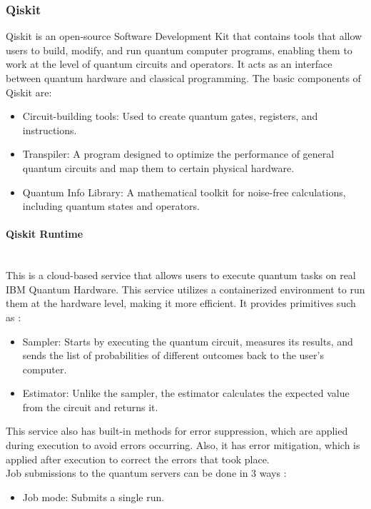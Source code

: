 \documentclass[a4paper]{report}
\begin{document}
{\begin{itemize}
\subsubsection{{Qiskit}}
Qiskit is an open-source Software Development Kit that contains tools that allow users to build, modify, and run quantum computer programs, enabling them to work at the level of quantum circuits and operators. It acts as an interface between quantum hardware and classical programming.
The basic components of Qiskit are:

\begin{itemize}
    \item Circuit-building tools: Used to create quantum gates, registers, and instructions.

\end{itemize}
\begin{itemize}
    \item Transpiler: A program designed to optimize the performance of general quantum circuits and map them to certain physical hardware.
\end{itemize}
\begin{itemize}
    \item Quantum Info Library: A mathematical toolkit for noise-free calculations, including quantum states and operators.
\end{itemize}
\paragraph{Qiskit Runtime}
\mbox{} \\
This is a cloud-based service that allows users to execute quantum tasks on real IBM Quantum Hardware. This service utilizes a containerized environment to run them at the hardware level, making it more efficient. It provides primitives such as :
\begin{itemize}
    \item Sampler:  Starts by executing the quantum circuit, measures its results, and sends the list of probabilities of different outcomes back to the user's computer.
\end{itemize}
\begin{itemize}
    \item Estimator: Unlike the sampler, the estimator calculates the expected value from the circuit and returns it.

\end{itemize}

This service also has built-in methods for error suppression, which are applied during execution to avoid errors occurring. Also, it has error mitigation, which is applied after execution to correct the errors that took place.
\\
Job submissions to the quantum servers can be done in 3 ways \cite{qiskiteco}:
\begin{itemize}
    \item Job mode: Submits a single run.


\end{itemize}
\end{itemize}}
\end{document}
